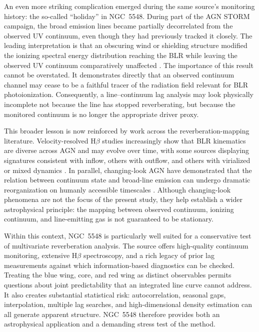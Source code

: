 \documentclass[fleqn,usenatbib]{mnras}
\begin{document}
An even more striking complication emerged during the same source's monitoring history: the so-called ``holiday'' in NGC~5548. During part of the AGN STORM campaign, the broad emission lines became partially decorrelated from the observed UV continuum, even though they had previously tracked it closely. The leading interpretation is that an obscuring wind or shielding structure modified the ionizing spectral energy distribution reaching the BLR while leaving the observed UV continuum comparatively unaffected \cite{Dehghanian2019}. The importance of this result cannot be overstated. It demonstrates directly that an observed continuum channel may cease to be a faithful tracer of the radiation field relevant for BLR photoionization. Consequently, a line--continuum lag analysis may look physically incomplete not because the line has stopped reverberating, but because the monitored continuum is no longer the appropriate driver proxy.

This broader lesson is now reinforced by work across the reverberation-mapping literature. Velocity-resolved H$\beta$ studies increasingly show that BLR kinematics are diverse across AGN and may evolve over time, with some sources displaying signatures consistent with inflow, others with outflow, and others with virialized or mixed dynamics \cite{Du2018,Wang2025,Feng2024}. In parallel, changing-look AGN have demonstrated that the relation between continuum state and broad-line emission can undergo dramatic reorganization on humanly accessible timescales \cite{RicciTrakhtenbrot2023}. Although changing-look phenomena are not the focus of the present study, they help establish a wider astrophysical principle: the mapping between observed continuum, ionizing continuum, and line-emitting gas is not guaranteed to be stationary.

Within this context, NGC~5548 is particularly well suited for a conservative test of multivariate reverberation analysis. The source offers high-quality continuum monitoring, extensive H$\beta$ spectroscopy, and a rich legacy of prior lag measurements against which information-based diagnostics can be checked. Treating the blue wing, core, and red wing as distinct observables permits questions about joint predictability that an integrated line curve cannot address. It also creates substantial statistical risk: autocorrelation, seasonal gaps, interpolation, multiple lag searches, and high-dimensional density estimation can all generate apparent structure. NGC~5548 therefore provides both an astrophysical application and a demanding stress test of the method.
\end{document}
